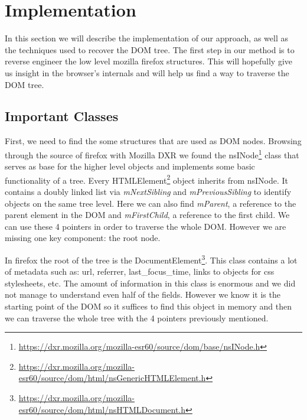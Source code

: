 \section{Implementation}
\label{sec:implementation}

In this section we will describe the implementation of our approach, as well as the techniques used to recover the DOM tree. The first step in our method is to reverse engineer the low level mozilla firefox structures. This will hopefully give us insight in the browser's internals and will help us find a way to traverse the DOM tree.

\subsection{Important Classes}
First, we need to find the some structures that are used as DOM nodes. Browsing through the source of firefox with Mozilla DXR\cite{dxrmozilla} we found the nsINode\footnote{\url{https://dxr.mozilla.org/mozilla-esr60/source/dom/base/nsINode.h}} class that serves as base for the higher level objects and implements some basic functionality of a tree. Every HTMLElement\footnote{\url{https://dxr.mozilla.org/mozilla-esr60/source/dom/html/nsGenericHTMLElement.h}} object inherits from nsINode. It contains a doubly linked list via \textit{mNextSibling} and \textit{mPreviousSibling} to identify objects on the same tree level. Here we can also find \textit{mParent}, a reference to the parent element in the DOM and \textit{mFirstChild}, a reference to the first child. We can use these 4 pointers in order to traverse the whole DOM. However we are missing one key component: the root node.

In firefox the root of the tree is the DocumentElement\footnote{\url{https://dxr.mozilla.org/mozilla-esr60/source/dom/html/nsHTMLDocument.h}}. This class contains a lot of metadata such as: url, referrer, last\_focus\_time, links to objects for css stylesheets, etc. The amount of information in this class is enormous and we did not manage to understand even half of the fields. However we know it is the starting point of the DOM so it suffices to find this object in memory and then we can traverse the whole tree with the 4 pointers previously mentioned.

